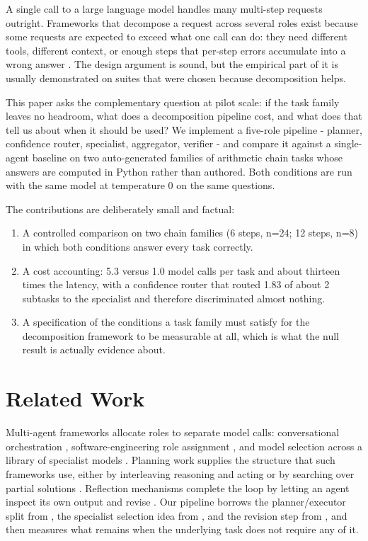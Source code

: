 \documentclass[runningheads,a4paper]{llncs}
\begin{document}
A single call to a large language model handles many multi-step requests outright. Frameworks that decompose a request across several roles exist because some requests are expected to exceed what one call can do: they need different tools, different context, or enough steps that per-step errors accumulate into a wrong answer \cite{struq2024,debenedetti2024agentdojo,interop2025,geifman2017selective}. The design argument is sound, but the empirical part of it is usually demonstrated on suites that were chosen because decomposition helps.

This paper asks the complementary question at pilot scale: if the task family leaves no headroom, what does a decomposition pipeline cost, and what does that tell us about when it should be used? We implement a five-role pipeline - planner, confidence router, specialist, aggregator, verifier - and compare it against a single-agent baseline on two auto-generated families of arithmetic chain tasks whose answers are computed in Python rather than authored. Both conditions are run with the same model at temperature 0 on the same questions.

The contributions are deliberately small and factual:

\begin{enumerate}

\item A controlled comparison on two chain families (6 steps, n=24; 12 steps, n=8) in which both conditions answer every task correctly.

\item A cost accounting: 5.3 versus 1.0 model calls per task and about thirteen times the latency, with a confidence router that routed 1.83 of about 2 subtasks to the specialist and therefore discriminated almost nothing.

\item A specification of the conditions a task family must satisfy for the decomposition framework to be measurable at all, which is what the null result is actually evidence about.

\end{enumerate}

\section{Related Work}

Multi-agent frameworks allocate roles to separate model calls: conversational orchestration \cite{interop2025}, software-engineering role assignment \cite{geifman2017selective}, and model selection across a library of specialist models \cite{struq2024}. Planning work supplies the structure that such frameworks use, either by interleaving reasoning and acting \cite{debenedetti2024agentdojo} or by searching over partial solutions \cite{camel2025}. Reflection mechanisms complete the loop by letting an agent inspect its own output and revise \cite{conformal2021,struq2024}. Our pipeline borrows the planner/executor split from \cite{camel2025}, the specialist selection idea from \cite{struq2024}, and the revision step from \cite{conformal2021}, and then measures what remains when the underlying task does not require any of it.
\end{document}
